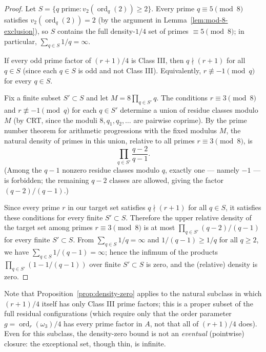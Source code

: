 \documentclass[12pt]{article}
\theoremstyle{plain}
\theoremstyle{definition}
\theoremstyle{remark}
\begin{document}
\begin{proof}
Let \(S = \{q \text{ prime} : v_2(\operatorname{ord}_q(2))
\geq 2\}\). Every prime \(q \equiv 5 \pmod{8}\) satisfies
\(v_2(\operatorname{ord}_q(2)) = 2\) (by the argument in
Lemma~\ref{lem:mod-8-exclusion}), so \(S\) contains the full density-\(1/4\) set
of primes \(\equiv 5 \pmod{8}\); in particular,
\(\sum_{q \in S} 1/q = \infty\).

If every odd prime factor of \((r+1)/4\) is Class III, then
\(q \nmid (r+1)\) for all \(q \in S\) (since each \(q \in S\)
is odd and not Class III). Equivalently,
\(r \not\equiv -1 \pmod{q}\) for every \(q \in S\).

Fix a finite subset \(S' \subset S\) and let
\(M = 8 \prod_{q \in S'} q\). The conditions
\(r \equiv 3 \pmod{8}\) and \(r \not\equiv -1 \pmod{q}\)
for each \(q \in S'\) determine a union of residue classes
modulo \(M\) (by CRT, since the moduli \(8, q_1, q_2, \ldots\) are
pairwise coprime). By the prime number theorem for arithmetic
progressions with the fixed modulus \(M\), the natural density
of primes in this union, relative to all primes
\(r \equiv 3 \pmod{8}\), is
\[
\prod_{q \in S'} \frac{q - 2}{q - 1}.
\]
(Among the \(q-1\) nonzero residue classes modulo \(q\), exactly
one --- namely \(-1\) --- is forbidden; the remaining
\(q-2\) classes are allowed, giving the factor \((q-2)/(q-1)\).)

Since every prime \(r\) in our target set satisfies
\(q \nmid (r+1)\) for all \(q \in S\), it satisfies these
conditions for every finite \(S' \subset S\). Therefore the
upper relative density of the target set among primes
\(r \equiv 3 \pmod{8}\) is at most
\(\prod_{q \in S'} (q-2)/(q-1)\) for every finite
\(S' \subset S\). From \(\sum_{q \in S} 1/q = \infty\) and
\(1/(q-1) \geq 1/q\) for all \(q \geq 2\), we have
\(\sum_{q \in S} 1/(q-1) = \infty\); hence the infimum of the
products \(\prod_{q \in S'} (1 - 1/(q-1))\) over finite
\(S' \subset S\) is zero, and the (relative) density is zero.\end{proof}

Note that Proposition~\ref{prop:density-zero} applies to the natural subclass in which
\((r+1)/4\) itself has only Class III prime factors; this is a
proper subset of the full residual configurations (which require
only that the order parameter \(g = \operatorname{ord}_r(\omega_3)/4\)
has every prime factor in \(A\), not that all of \((r+1)/4\) does).
Even for this subclass, the density-zero bound is not an \emph{eventual}
(pointwise) closure: the exceptional set, though thin, is infinite.
\end{document}
